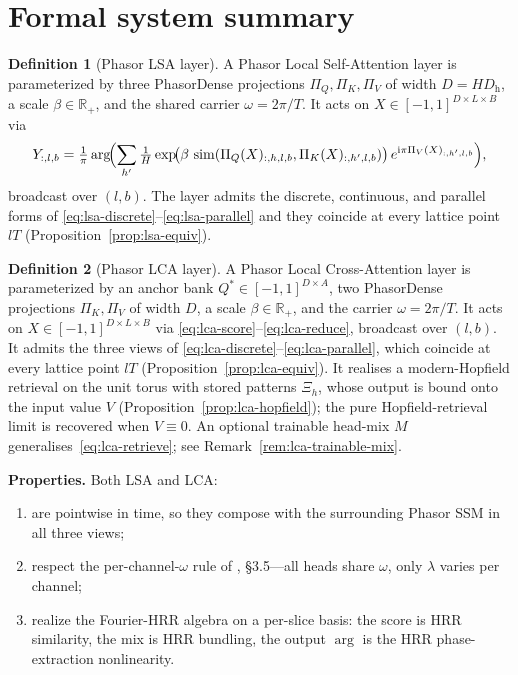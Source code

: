 \documentclass[11pt]{article}
\newcommand{\R}{\mathbb{R}}
\newcommand{\im}{\mathrm{i}}
\newcommand{\nh}{H}              %
\newcommand{\Dh}{D_{\mathrm{h}}} %
\newcommand{\sm}{\operatorname{sim}}
\theoremstyle{definition}
\newtheorem{definition}{Definition}
\begin{document}
\section{Formal system summary}\label{sec:summary}

\begin{definition}[Phasor LSA layer]
A Phasor Local Self-Attention layer is parameterized by three
PhasorDense projections $\Pi_Q, \Pi_K, \Pi_V$ of width $D = \nh\Dh$,
a scale $\beta\in\R_+$, and the shared carrier $\omega = 2\pi/T$. It
acts on $X\in[-1,1]^{D\times L\times B}$ via
\[
  Y_{:,l,b}
  = \tfrac{1}{\pi}\arg\!\Bigl(
      \sum_{h'}\tfrac{1}{\nh}\exp\!\bigl(\beta\,\sm(\Pi_Q(X)_{:,h,l,b},
                                                  \Pi_K(X)_{:,h',l,b})\bigr)\,
        e^{\im\pi \Pi_V(X)_{:,h',l,b}}\Bigr),
\]
broadcast over $(l, b)$. The layer admits the discrete, continuous,
and parallel forms of \eqref{eq:lsa-discrete}--\eqref{eq:lsa-parallel}
and they coincide at every lattice point $l T$
(Proposition~\ref{prop:lsa-equiv}).
\end{definition}

\begin{definition}[Phasor LCA layer]
A Phasor Local Cross-Attention layer is parameterized by an anchor
bank $Q^{*}\in[-1,1]^{D\times A}$, two PhasorDense projections
$\Pi_K, \Pi_V$ of width $D$, a scale $\beta\in\R_+$, and the carrier
$\omega = 2\pi/T$. It acts on $X\in[-1,1]^{D\times L\times B}$ via
\eqref{eq:lca-score}--\eqref{eq:lca-reduce}, broadcast over $(l, b)$.
It admits the three views of
\eqref{eq:lca-discrete}--\eqref{eq:lca-parallel}, which coincide at
every lattice point $l T$ (Proposition~\ref{prop:lca-equiv}). It
realises a modern-Hopfield retrieval on the unit torus with stored
patterns $\Xi_h$, whose output is bound onto the input value $V$
(Proposition~\ref{prop:lca-hopfield}); the pure Hopfield-retrieval
limit is recovered when $V \equiv 0$. An optional trainable head-mix
$M$ generalises~\eqref{eq:lca-retrieve}; see
Remark~\ref{rem:lca-trainable-mix}.
\end{definition}

\medskip
\noindent\textbf{Properties.} Both LSA and LCA:
\begin{enumerate}[nosep,leftmargin=*]
  \item are pointwise in time, so they compose with the surrounding
        Phasor SSM in all three views;
  \item respect the per-channel-$\omega$ rule of
        \cite{phasor-ssm-derivation}, \S3.5---all heads share $\omega$,
        only $\lambda$ varies per channel;
  \item realize the Fourier-HRR algebra on a per-slice basis: the
        score is HRR similarity, the mix is HRR bundling, the output
        $\arg$ is the HRR phase-extraction nonlinearity.
\end{enumerate}
\end{document}
